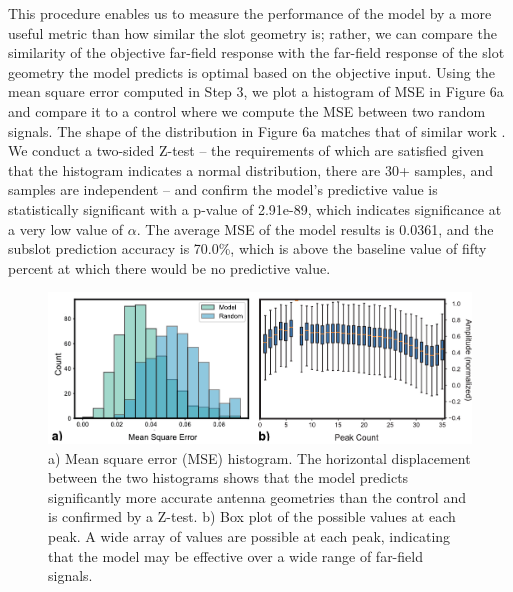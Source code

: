 \documentclass[11pt]{article}
\begin{document}
\noindent This procedure enables us to measure the performance of the model by a more useful metric than how similar the slot geometry is; rather, we can compare the similarity of the objective far-field response with the far-field response of the slot geometry the model predicts is optimal based on the objective input. Using the mean square error computed in Step 3, we plot a histogram of MSE in Figure 6a and compare it to a control where we compute the MSE between two random signals. The shape of the distribution in Figure 6a matches that of similar work \cite{Nadell:19}. We conduct a two-sided Z-test -- the requirements of which are satisfied given that the histogram indicates a normal distribution, there are 30+ samples, and samples are independent -- and confirm the model's predictive value is statistically significant with a p-value of 2.91e-89, which indicates significance at a very low value of $\alpha$. The average MSE of the model results is 0.0361, and the subslot prediction accuracy is 70.0\%, which is above the baseline value of fifty percent at which there would be no predictive value. 
\begin{figure}[H]
	\includegraphics[width=6.5in]{figures/fig6apdf}
		\caption{a) Mean square error (MSE) histogram. The horizontal displacement between the two histograms shows that the model predicts significantly more accurate antenna geometries than the control and is confirmed by a Z-test. b) Box plot of the possible values at each peak. A wide array of values are possible at each peak, indicating that the model may be effective over a wide range of far-field signals.}
\end{figure}
\end{document}
